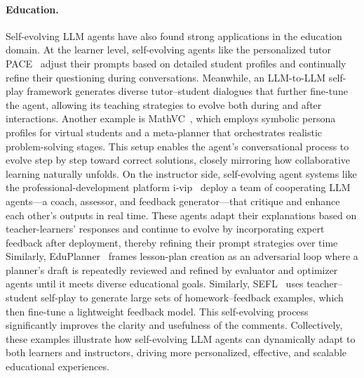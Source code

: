 \paragraph{Education.}

Self-evolving LLM agents have also found strong applications in the education domain.
At the learner level, self-evolving agents like the personalized tutor PACE~\citep{liu2025pace} adjust their prompts based on detailed student profiles and continually refine their questioning during conversations. Meanwhile, an LLM-to-LLM self-play framework generates diverse tutor–student dialogues that further fine-tune the agent, allowing its teaching strategies to evolve both during and after interactions.
Another example is MathVC~\citep{yue2025mathvc}, which employs symbolic persona profiles for virtual students and a meta-planner that orchestrates realistic problem-solving stages. This setup enables the agent’s conversational process to evolve step by step toward correct solutions, closely mirroring how collaborative learning naturally unfolds.
On the instructor side, self-evolving agent systems like the professional-development platform i‑vip~\citep{yang2025ivip} deploy a team of cooperating LLM agents—a coach, assessor, and feedback generator—that critique and enhance each other’s outputs in real time. These agents adapt their explanations based on teacher-learners’ responses and continue to evolve by incorporating expert feedback after deployment, thereby refining their prompt strategies over time
Similarly,  EduPlanner~\citep{zhang2025eduplanner} frames lesson-plan creation as an adversarial loop where a planner’s draft is repeatedly reviewed and refined by evaluator and optimizer agents until it meets diverse educational goals.
Similarly, \textsc{SEFL}~\citep{zhang2025sefl} uses teacher–student self-play to generate large sets of homework–feedback examples, which then fine-tune a lightweight feedback model. This self-evolving process significantly improves the clarity and usefulness of the comments.
Collectively, these examples illustrate how self-evolving LLM agents can dynamically adapt to both learners and instructors, driving more personalized, effective, and scalable educational experiences.


